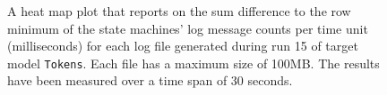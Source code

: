 \begin{figure}[htbp]
\centering
\begin{minipage}{1\textwidth}
  \centering
\end{minipage}
\caption{A heat map plot that reports on the sum difference to the row minimum of the state machines' log message counts per time unit (milliseconds) for each log file generated during run 15 of target model \texttt{Tokens}. Each file has a maximum size of 100MB. The results have been measured over a time span of 30 seconds.}
\label{figure:throughput_difference_tokens_15}
\end{figure}